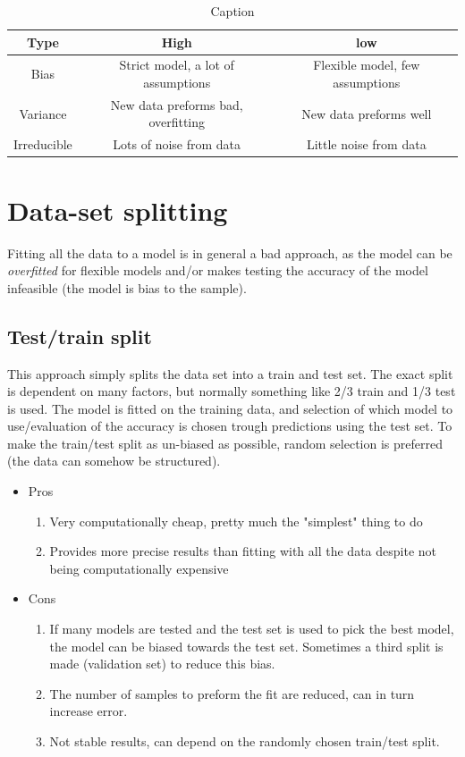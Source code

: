 \documentclass{article}
\begin{document}
\begin{table}[H]
    \centering
    \begin{tabular}{|c|c|c|}
         \hline
         Type &  High & low\\
         \hline
         Bias & Strict model, a lot of assumptions & Flexible model, few assumptions \\
         \hline
         Variance & New data preforms bad, overfitting & New data preforms well \\
         \hline
         Irreducible & Lots of noise from data &  Little noise from data\\
         \hline
    \end{tabular}
    \caption{Caption}
    \label{tab:my_label}
\end{table}

\section{Data-set splitting}
Fitting all the data to a model is in general a bad approach, as the model can be \textit{overfitted} for flexible models and/or makes testing the accuracy of the model infeasible (the model is bias to the sample). 

\subsection{Test/train split}
This approach simply splits the data set into a train and test set. The exact split is dependent on many factors, but normally something like 2/3 train and 1/3 test is used. The model is fitted on the training data, and selection of which model to use/evaluation of the accuracy is chosen trough predictions using the test set. To make the train/test split as un-biased as possible, random selection is preferred (the data can somehow be structured).

\begin{itemize}
    \item Pros 
    \begin{enumerate}
        \item Very computationally cheap, pretty much the "simplest" thing to do
        \item Provides more precise results than fitting with all the data despite not being computationally expensive
    \end{enumerate}
    
    \item Cons
    \begin{enumerate}
        \item If many models are tested and the test set is used to pick the best model, the model can be biased towards the test set. Sometimes a third split is made (validation set) to reduce this bias.
        \item The number of samples to preform the fit are reduced, can in turn increase error.
        \item Not stable results, can depend on the randomly chosen train/test split.
    \end{enumerate}
\end{itemize}
\end{document}
